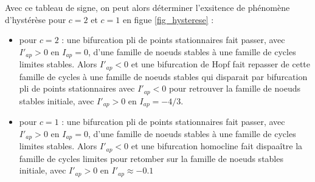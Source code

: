 \documentclass[12pt,a4paper,onecolumn]{article}
\begin{document}
Avec ce tableau de signe, on peut alors déterminer l'exsitence de phénomène d'hystérèse pour $c=2$ et $c=1$ en figue \ref{fig_hysterese} :
\begin{itemize}
	\item pour $c=2$ : une bifurcation pli de points stationnaires fait passer, avec $I'_{ap} > 0$ en $I_{ap} = 0$, d'une famille de noeuds stables à une famille de cycles limites stables. Alors $I'_{ap} < 0$ et une bifurcation de Hopf fait repasser de cette famille de cycles à une famille de noeuds stables qui disparait par bifurcation pli de points stationnaires avec $I'_{ap} < 0$ pour retrouver la famille de noeuds stables initiale, avec $I'_{ap} > 0$ en $I_{ap} = -4/3$.
	\item pour $c=1$ : une bifurcation pli de points stationnaires fait passer, avec $I'_{ap} > 0$ en $I_{ap} = 0$, d'une famille de noeuds stables à une famille de cycles limites stables. Alors $I'_{ap} < 0$ et une bifurcation homocline fait dispaaître la famille de cycles limites pour retomber sur la famille de noeuds stables initiale, avec $I'_{ap} > 0$ en $I'_{ap} \approx -0.1$
\end{itemize}
\end{document}
